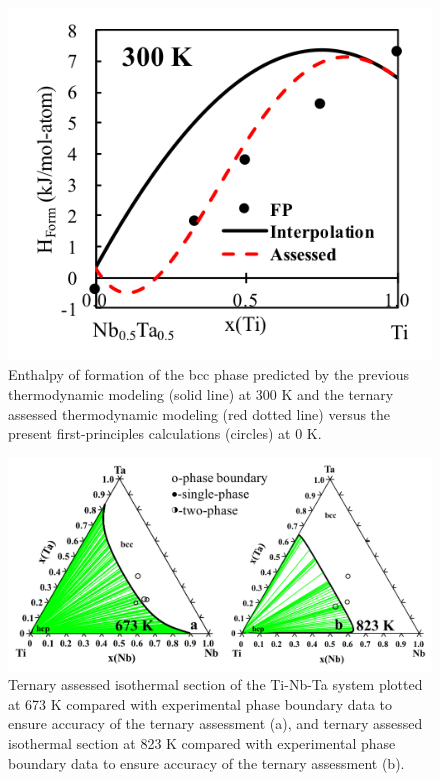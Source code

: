 \newpage
\begin{figure}[H]
	\centering
	\includegraphics{Chapter-3/Figures/TiNbTa2.png}
	\caption{Enthalpy of formation of the bcc phase predicted by the previous thermodynamic modeling (solid line) at 300 K and the ternary assessed thermodynamic modeling (red dotted line) versus the present first-principles calculations (circles) at 0 K.}
	\label{Ch3-figure:TiNbTa2}
\end{figure}

\newpage
\begin{figure}[H]
	\centering
	\includegraphics[width=\textwidth]{Chapter-3/Figures/TiNbTa3.png}
	\caption{Ternary assessed isothermal section of the Ti-Nb-Ta system plotted at 673 K compared with experimental phase boundary data \cite{Na2001} to ensure accuracy of the ternary assessment (a), and ternary assessed isothermal section at 823 K compared with experimental phase boundary data \cite{Na2001} to ensure accuracy of the ternary assessment (b).}
	\label{Ch3-figure:TiNbTa3}
\end{figure}


